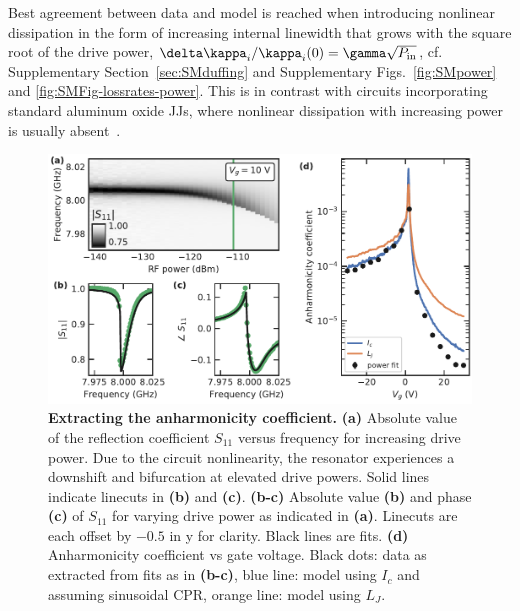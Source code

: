 Best agreement between data and model is reached when introducing nonlinear dissipation in the form of increasing internal linewidth that grows with the square root of the drive power, $\delta\kappa_i/\kappa_i(0)=\gamma \sqrt{P_{\rm in}}$, cf. Supplementary Section~\ref{sec:SMduffing} and Supplementary Figs.~\ref{fig:SMpower} and \ref{fig:SMFig-lossrates-power}.
%
This is in contrast with circuits incorporating standard aluminum oxide JJs, where nonlinear dissipation with increasing power is usually absent~\cite{boakninDispersiveMicrowaveBifurcation2007b}.

\begin{figure}[t]
	\centering
	\includegraphics[width=\linewidth]{chapter-gJJ-CPR/figs/Figure3}
	\caption{
		\textbf{Extracting the anharmonicity coefficient.}
		\textbf{(a)} Absolute value of the reflection coefficient $S_{11}$ versus frequency for increasing drive power.
		Due to the circuit nonlinearity, the resonator experiences a downshift and bifurcation at elevated drive powers.
		Solid lines indicate linecuts in \textbf{(b)} and \textbf{(c)}.
		\textbf{(b-c)} Absolute value \textbf{(b)} and phase \textbf{(c)} of $S_{11}$ for varying drive power as indicated in \textbf{(a)}.
		Linecuts are each offset by $-0.5$ in y for clarity.
		Black lines are fits.
		\textbf{(d)} Anharmonicity coefficient vs gate voltage.
		Black dots: data as extracted from fits as in \textbf{(b-c)}, blue line: model using $I_c$ and assuming sinusoidal CPR, orange line: model using $L_J$.
	}
	\label{fig:figure3}
\end{figure}


